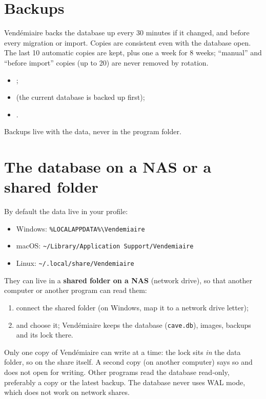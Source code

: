 \documentclass[11pt,a4paper]{article}
\begin{document}

\section{Backups}
Vendémiaire backs the database up every 30 minutes if it changed, and before every migration or import.
Copies are consistent even with the database open. The last 10 automatic copies are kept, plus one a week for
8 weeks; ``manual'' and ``before import'' copies (up to 20) are never removed by rotation.
\begin{itemize}
  \item {};
  \item {} (the current database is backed up first);
  \item {}.
\end{itemize}
Backups live with the data, never in the program folder.

\section{The database on a NAS or a shared folder}
By default the data live in your profile:
\begin{itemize}
  \item Windows: \texttt{\%LOCALAPPDATA\%\textbackslash Vendemiaire}
  \item macOS: \texttt{\textasciitilde/Library/Application Support/Vendemiaire}
  \item Linux: \texttt{\textasciitilde/.local/share/Vendemiaire}
\end{itemize}
They can live in a \textbf{shared folder on a NAS} (network drive), so that another computer or another
program can read them:
\begin{enumerate}
  \item connect the shared folder (on Windows, map it to a network drive letter);
  \item {} and choose it; Vendémiaire keeps the database (\texttt{cave.db}), images,
        backups and its lock there.
\end{enumerate}
\begin{attention}
Only one copy of Vendémiaire can write at a time: the lock sits \emph{in} the data folder, so on the share
itself. A second copy (on another computer) says so and does not open for writing. Other programs read the
database read-only, preferably a copy or the latest backup. The database never uses WAL mode, which does not
work on network shares.
\end{attention}
\end{document}

